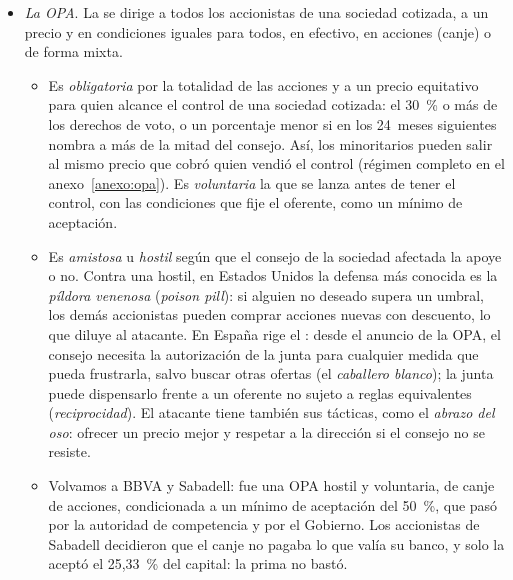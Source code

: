 \documentclass[11pt]{article}
\begin{document}
\begin{itemize}
\item \emph{La OPA}. La  se dirige a todos los accionistas de una sociedad cotizada, a un precio y en condiciones iguales para todos, en efectivo, en acciones (canje) o de forma mixta.
  \begin{itemize}
  \item Es \emph{obligatoria} por la totalidad de las acciones y a un precio equitativo para quien alcance el control de una sociedad cotizada: el 30~\% o más de los derechos de voto, o un porcentaje menor si en los 24~meses siguientes nombra a más de la mitad del consejo\nocite{BOE2023LMV,BOE2007OPA}. Así, los minoritarios pueden salir al mismo precio que cobró quien vendió el control (régimen completo en el anexo~\ref{anexo:opa}). Es \emph{voluntaria} la que se lanza antes de tener el control, con las condiciones que fije el oferente, como un mínimo de aceptación.
  \item Es \emph{amistosa} u \emph{hostil} según que el consejo de la sociedad afectada la apoye o no. Contra una hostil, en Estados Unidos la defensa más conocida es la \emph{píldora venenosa} (\emph{poison pill}): si alguien no deseado supera un umbral, los demás accionistas pueden comprar acciones nuevas con descuento, lo que diluye al atacante. En España rige el : desde el anuncio de la OPA, el consejo necesita la autorización de la junta para cualquier medida que pueda frustrarla, salvo buscar otras ofertas (el \emph{caballero blanco}); la junta puede dispensarlo frente a un oferente no sujeto a reglas equivalentes (\emph{reciprocidad})\nocite{BOE2023LMV}. El atacante tiene también sus tácticas, como el \emph{abrazo del oso}: ofrecer un precio mejor y respetar a la dirección si el consejo no se resiste.
  \item Volvamos a BBVA y Sabadell: fue una OPA hostil y voluntaria, de canje de acciones, condicionada a un mínimo de aceptación del 50~\%, que pasó por la autoridad de competencia y por el Gobierno. Los accionistas de Sabadell decidieron que el canje no pagaba lo que valía su banco, y solo la aceptó el 25,33~\% del capital\nocite{CNMV2025ResultadoOPA}: la prima no bastó.
  \end{itemize}
\end{itemize}
\end{document}
